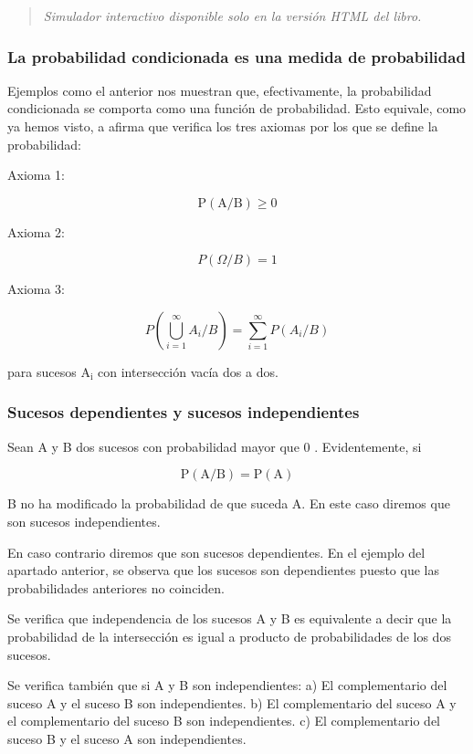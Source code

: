 \documentclass[
]{article}
\begin{document}
\begin{quote}
\emph{Simulador interactivo disponible solo en la versión HTML del libro.}
\end{quote}

\subsubsection{La probabilidad condicionada es una medida de probabilidad}\label{la-probabilidad-condicionada-es-una-medida-de-probabilidad}

Ejemplos como el anterior nos muestran que, efectivamente, la probabilidad condicionada se comporta como una función de probabilidad. Esto equivale, como ya hemos visto, a afirma que verifica los tres axiomas por los que se define la probabilidad:

Axioma 1:

\[
\mathrm{P}(\mathrm{A} / \mathrm{B}) \geq 0
\]

Axioma 2:

\[
P(\Omega / B)=1
\]

Axioma 3:

\[
P\left(\bigcup_{i=1}^{\infty} A_{i} / B\right)=\sum_{i=1}^{\infty} P\left(A_{i} / B\right)
\]

para sucesos \(\mathrm{A}_{\mathrm{i}}\) con intersección vacía dos a dos.

\subsubsection{Sucesos dependientes y sucesos independientes}\label{sucesos-dependientes-y-sucesos-independientes}

Sean A y B dos sucesos con probabilidad mayor que 0 . Evidentemente, si

\[
\mathrm{P}(\mathrm{A} / \mathrm{B})=\mathrm{P}(\mathrm{A})
\]

B no ha modificado la probabilidad de que suceda A. En este caso diremos
que son sucesos independientes.

En caso contrario diremos que son sucesos dependientes. En el ejemplo
del apartado anterior, se observa que los sucesos son dependientes
puesto que las probabilidades anteriores no coinciden.

Se verifica que independencia de los sucesos A y B es equivalente a
decir que la probabilidad de la intersección es igual a producto de
probabilidades de los dos sucesos.

Se verifica también que si A y B son independientes: a) El
complementario del suceso A y el suceso B son independientes. b) El
complementario del suceso A y el complementario del suceso B son
independientes. c) El complementario del suceso B y el suceso A son
independientes.
\end{document}
